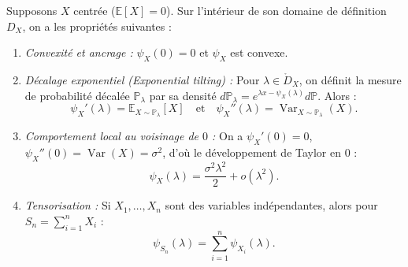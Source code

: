 \begin{prop}
    Supposons $X$ centrée ($\mathbb{E}[X] = 0$). Sur l'intérieur de son domaine de définition $D_X$, on a les propriétés suivantes : 
    \begin{enumerate}
        \item \emph{Convexité et ancrage :} $\psi_X(0) = 0$ et $\psi_X$ est convexe.
        \item \emph{Décalage exponentiel (Exponential tilting) :} Pour $\lambda \in \mathring{D}_X$, on définit la mesure de probabilité décalée $\mathbb{P}_\lambda$ par sa densité $d\mathbb{P}_\lambda = e^{\lambda x - \psi_X(\lambda)} d\mathbb{P}$. Alors :
        \begin{equation}
            \psi_X'(\lambda) = \mathbb{E}_{X \sim \mathbb{P}_\lambda}[X] \quad \text{et} \quad \psi_X''(\lambda) = \operatorname{Var}_{X \sim \mathbb{P}_\lambda}(X).
        \end{equation}
        \item \emph{Comportement local au voisinage de $0$ :} On a $\psi_X'(0) = 0$, $\psi_X''(0) = \operatorname{Var}(X) = \sigma^2$, d'où le développement de Taylor en $0$ :
        \begin{equation}
            \psi_X(\lambda) = \frac{\sigma^2 \lambda^2}{2} + o(\lambda^2).
        \end{equation}
        \item \emph{Tensorisation :} Si $X_1, \dots, X_n$ sont des variables indépendantes, alors pour $S_n = \sum_{i=1}^n X_i$ :
        \begin{equation}
            \psi_{S_n}(\lambda) = \sum_{i=1}^n \psi_{X_i}(\lambda).
        \end{equation}
    \end{enumerate}
\end{prop}

